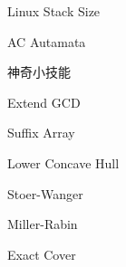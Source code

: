 \documentclass[12pt]{article}
\begin{document}
\begin{section}{Linux Stack Size}
  
\end{section}

\begin{section}{AC Autamata}
  \begin{multicols}{2}
    
  \end{multicols}
\end{section}

\begin{multicols}{2}
  \begin{section}{神奇小技能}
    
  \end{section}

  \begin{section}{Extend GCD}
    
  \end{section}
\end{multicols}

\begin{section}{Suffix Array}
  
\end{section}

\begin{section}{Lower Concave Hull}
  
\end{section}

\begin{section}{Stoer-Wanger}
  \begin{multicols}{2}
    
  \end{multicols}
\end{section}

\begin{section}{Miller-Rabin}
  \begin{multicols}{2}
    
  \end{multicols}
\end{section}

\begin{section}{Exact Cover}
  \begin{multicols}{2}
    
  \end{multicols}
\end{section}
\end{document}
